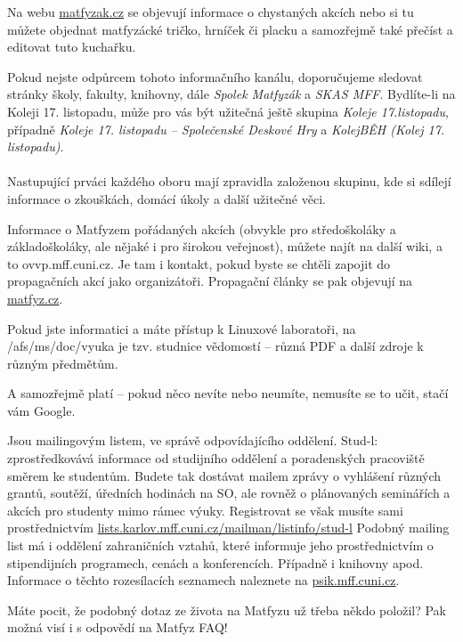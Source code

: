 Na webu \url{matfyzak.cz} se objevují informace o chystaných akcích nebo si tu
můžete objednat matfyzácké tričko, hrníček či placku a samozřejmě také přečíst a
editovat tuto kuchařku.


Pokud nejste odpůrcem tohoto informačního kanálu, doporučujeme sledovat stránky
školy, fakulty, knihovny, dále \textit{Spolek Matfyzák} a \textit{SKAS MFF}.
Bydlíte-li na Koleji 17. listopadu, může pro vás být užitečná ještě skupina
\textit{Koleje 17.listopadu}, případně \textit{Koleje 17. listopadu –
Společenské Deskové Hry} a \textit{KolejBĚH (Kolej 17. listopadu)}.
\\\\
Nastupující prváci každého oboru mají zpravidla založenou skupinu, kde si
sdílejí informace o zkouškách, domácí úkoly a další užitečné věci.


Informace o Matfyzem pořádaných akcích (obvykle pro středoškoláky a
základoškoláky, ale nějaké i pro širokou veřejnost), můžete najít na další wiki,
a to ovvp.mff.cuni.cz. Je tam i kontakt, pokud byste se chtěli zapojit do
propagačních akcí jako organizátoři. Propagační články se pak objevují na
\url{matfyz.cz}.


Pokud jste informatici a máte přístup k Linuxové laboratoři, na
/afs/ms/doc/vyuka je tzv. studnice vědomostí – různá PDF a další zdroje k různým
předmětům.


A samozřejmě platí – pokud něco nevíte nebo neumíte, nemusíte se to učit, stačí
vám Google.


Jsou mailingovým listem, ve správě odpovídajícího oddělení. Stud-l:
zprostředkovává informace od studijního oddělení a poradenských pracoviště
směrem ke studentům. Budete tak dostávat mailem zprávy o vyhlášení různých
grantů, soutěží, úředních hodinách na SO, ale rovněž o plánovaných seminářích a
akcích pro studenty mimo rámec výuky. Registrovat se však musíte sami
prostřednictvím \url{lists.karlov.mff.cuni.cz/mailman/listinfo/stud-l} Podobný
mailing list má i oddělení zahraničních vztahů, které informuje jeho
prostřednictvím o stipendijních programech, cenách a konferencích. Případně i
knihovny apod. Informace o těchto rozesílacích seznamech naleznete na
\url{psik.mff.cuni.cz}.


Máte pocit, že podobný dotaz ze života na Matfyzu už třeba někdo položil? Pak
možná visí i s odpovědí na Matfyz FAQ!


